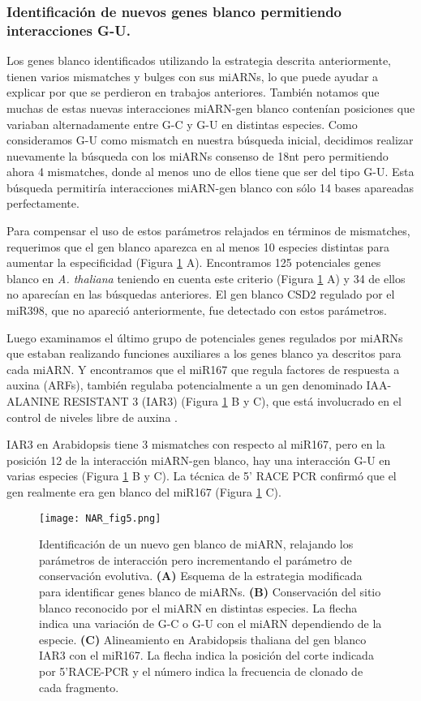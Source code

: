 \subsubsection{Identificación de nuevos genes blanco permitiendo interacciones G-U.}

Los genes blanco identificados utilizando la estrategia descrita anteriormente, tienen varios mismatches y bulges con sus miARNs, lo que puede ayudar a explicar por que se perdieron en trabajos anteriores. 
También notamos que muchas de estas nuevas interacciones miARN-gen blanco contenían posiciones que variaban alternadamente entre G-C y G-U en distintas especies.
Como consideramos G-U como mismatch en nuestra búsqueda inicial, decidimos realizar nuevamente la búsqueda con los miARNs consenso de 18nt pero permitiendo ahora 4 mismatches, donde al menos uno de ellos tiene que ser del tipo G-U.
Esta búsqueda permitiría interacciones miARN-gen blanco con sólo 14 bases apareadas perfectamente.

Para compensar el uso de estos parámetros relajados en términos de mismatches, requerimos que el gen blanco aparezca en al menos 10 especies distintas para aumentar la especificidad (Figura \ref{fig:NAR_fig5} A).
Encontramos 125 potenciales genes blanco en \textit{A. thaliana} teniendo en cuenta este criterio (Figura \ref{fig:NAR_fig5} A) y 34 de ellos no aparecían en las búsquedas anteriores.
El gen blanco CSD2 regulado por el miR398, que no apareció anteriormente, fue detectado con estos parámetros. 

Luego examinamos el último grupo de potenciales genes regulados por miARNs que estaban realizando funciones auxiliares a los genes blanco ya descritos para cada miARN. 
Y encontramos que el miR167 que regula factores de respuesta a auxina (ARFs), también regulaba potencialmente a un gen denominado IAA-ALANINE RESISTANT 3 (IAR3) (Figura \ref{fig:NAR_fig5} B y C), que está involucrado en el control de niveles libre de auxina \citep{Davies1999,Rampey2004}.

IAR3 en Arabidopsis tiene 3 mismatches con respecto al miR167, pero en la posición 12 de la interacción miARN-gen blanco, hay una interacción G-U en varias especies (Figura \ref{fig:NAR_fig5} B y C).
La técnica de 5’ RACE PCR confirmó que el gen realmente era gen blanco del miR167 (Figura \ref{fig:NAR_fig5} C).

\begin{figure}[htbp!] 
    \centering    
    \texttt{[image: NAR\_fig5.png]}
    \caption[]{Identificación de un nuevo gen blanco de miARN, relajando los parámetros de interacción pero incrementando el parámetro de conservación evolutiva.
    \textbf{(A)} Esquema de la estrategia modificada para identificar genes blanco de miARNs.
    \textbf{(B)} Conservación del sitio blanco reconocido por el miARN en distintas especies.
    La flecha indica una variación de G-C o G-U con el miARN dependiendo de la especie.
    \textbf{(C)} Alineamiento en Arabidopsis thaliana del gen blanco IAR3 con el miR167. La flecha indica la posición del corte indicada por 5’RACE-PCR y el número indica la frecuencia de clonado de cada fragmento.}
    \label{fig:NAR_fig5}
\end{figure}


